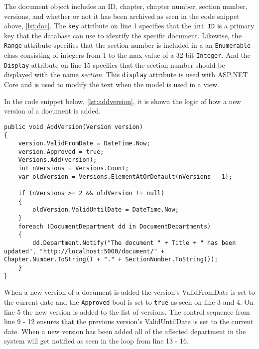 

The document object includes an ID, chapter, chapter number, section number, versions, and whether or not it has been archived as seen in the code snippet above, \cref{lst:doc}.
The \texttt{key} attribute on line 1 specifies that the \texttt{int ID} is a primary key that the database can use to identify the specific document.
Likewise, the \texttt{Range} attribute specifies that the section number is included in a an \texttt{Enumerable} class consisting of integers from 1 to the max value of a 32 bit \texttt{Integer}.
And the \texttt{Display} attribute on line 15 specifies that the section number should be displayed with the name \textit{section}.
This \texttt{display} attribute is used with ASP.NET Core and is used to modify the text when the model is used in a view.

In the code snippet below, \cref{lst:addversion}, it is shown the logic of how a new version of a document is added.
\\

\begin{lstlisting}[caption={Document Model: AddVersion}, label={lst:addversion}]
public void AddVersion(Version version)
{
	version.ValidFromDate = DateTime.Now;
	version.Approved = true;
	Versions.Add(version);
	int nVersions = Versions.Count;
	var oldVersion = Versions.ElementAtOrDefault(nVersions - 1);

	if (nVersions >= 2 && oldVersion != null)
	{
		oldVersion.ValidUntilDate = DateTime.Now;
	}
	foreach (DocumentDepartment dd in DocumentDepartments)
	{
		dd.Department.Notify("The document " + Title + " has been updated", "http://localhost:5000/document/" + Chapter.Number.ToString() + "." + SectionNumber.ToString());
	}
}
\end{lstlisting}

When a new version of a document is added the version's ValidFromDate is set to the current date and the \texttt{Approved} bool is set to \texttt{true} as seen on line 3 and 4.
On line 5 the new version is added to the list of versions.
The control sequence from line 9 - 12 ensures that the previous version's ValidUntilDate is set to the current date.
When a new version has been added all of the affected department in the system will get notified as seen in the loop from line 13 - 16.

